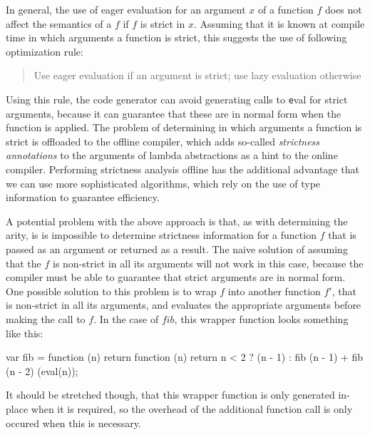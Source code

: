 In general, the use of eager evaluation for an argument $x$ of a function $f$
does not affect the semantics of a $f$ if $f$ is strict in $x$. Assuming that it
is known at compile time in which arguments a function is strict, this suggests
the use of following optimization rule:

\begin{quote}
Use eager evaluation if an argument is strict; use lazy evaluation otherwise
\end{quote}

Using this rule, the code generator can avoid generating calls to {\texttt eval}
for strict arguments, because it can guarantee that these are in normal form
when the function is applied. The problem of determining in which arguments a
function is strict is offloaded to the offline compiler, which adds so-called
{\em strictness annotations} to the arguments of lambda abstractions as a hint
to the online compiler. Performing strictness analysis offline has the
additional advantage that we can use more sophisticated algorithms, which rely
on the use of type information to guarantee efficiency.

A potential problem with the above approach is that, as with determining the
arity, is is impossible to determine strictness information for a function $f$
that is passed as an argument or returned as a result. The naive solution of
assuming that the $f$ is non-strict in all its arguments will not work in this
case, because the compiler must be able to guarantee that strict arguments are
in normal form. One possible solution to this problem is to wrap $f$ into
another function $f'$, that is non-strict in all its arguments, and evaluates
the appropriate arguments before making the call to $f$. In the case of $fib$,
this wrapper function looks something like this:

\begin{CleanCode}
var fib = function (n) {
    return function (n) {
        return n < 2 ? (n - 1) : fib (n - 1) + fib (n - 2)
    }(eval(n));
}
\end{CleanCode}

It should be stretched though, that this wrapper function is only generated
in-place when it is required, so the overhead of the additional function call
is only occured when this is necessary.
